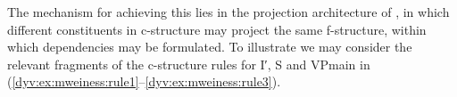 \documentclass[output=paper]{langsci/langscibook}
\begin{document}
The mechanism for achieving this lies in the projection architecture of , in which different constituents in c-structure may project the same f-structure, within which dependencies may be formulated.
To illustrate we may consider the relevant fragments of the c-structure rules for \textsf{I′}, \textsf{S} and \textsf{VPmain} in (\ref{dyv:ex:mweiness:rule1}--\ref{dyv:ex:mweiness:rule3}).



\end{document}
